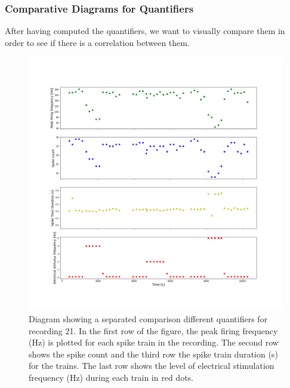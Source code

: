 \subsubsection{Comparative Diagrams for Quantifiers}
After having computed the quantifiers, we want to visually compare them in order to see if there is a correlation between them.
\begin{figure}
	\includegraphics[width = \textwidth]{src/pic/11_12_13U1bpff_sc_s_16_16}
	\caption{Diagram showing a separated comparison different quantifiers for recording 21. In the first row of the figure, the peak firing frequency (Hz) is plotted for each spike train in the recording. The second row shows the spike count and the third row the spike train duration (s) for the trains. The last row shows the level of electrical stimulation frequency (Hz) during each train in red dots.}
	\label{fig:quantcomp_sp}
\end{figure}
